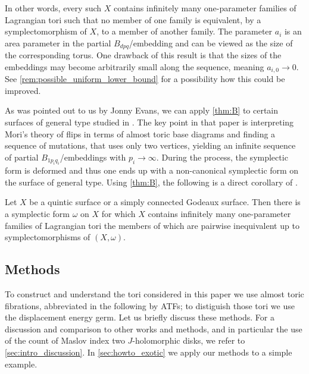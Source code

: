 \documentclass[AIF,Unicode,manuscript]{cedram}
\begin{document}
In other words, every such $X$ contains infinitely many one-parameter families of Lagrangian tori such that no member of one family is equivalent,  by a symplectomorphism of $X$, to a member of another family.
The parameter $a_i$ is an area parameter in the partial $B_{dpq}$\-/embedding and can be viewed as the size of the corresponding torus.
One drawback of this result is that the sizes of the embeddings may become arbitrarily small along the sequence, meaning $a_{i,0} \rightarrow 0$.
See \cref{rem:possible_uniform_lower_bound} for a possibility how this could be improved.

As was pointed out to us by Jonny Evans, we can apply \cref{thm:B} to certain surfaces of general type studied in \cite{EvaUrz21}.
The key point in that paper is interpreting Mori's theory of flips in terms of almost toric base diagrams and finding a sequence of mutations, that uses only two vertices,  yielding an infinite sequence of partial $B_{1p_iq_i}$\-/embeddings with $p_i \rightarrow \infty$.
During the process, the symplectic form is deformed and thus one ends up with a non-canonical symplectic form on the surface of general type.
Using \cref{thm:B}, the following is a direct corollary of \cite[Theorem 1.1]{EvaUrz21}.

\begin{corollary}
    \label{thm:quinticgodeaux}
    Let $X$ be a quintic surface or a simply connected Godeaux surface.
Then there is a symplectic form $\omega$ on $X$ for which $X$ contains infinitely many one-parameter families of Lagrangian tori the members of which are pairwise inequivalent up to symplectomorphisms of $(X,\omega)$.
\end{corollary}

\subsection{Methods}
\label{sec:intro_methods}

To construct and understand the tori considered in this paper we use almost toric fibrations, abbreviated in the following by ATFs; to distiguish those tori we use the displacement energy germ.
Let us briefly discuss these methods.
For a discussion and comparison to other works and methods, and in particular the use of the count of Maslov index two $J$-holomorphic disks, we refer to \cref{sec:intro_discussion}.
In \cref{sec:howto_exotic} we apply our methods to a simple example.
\end{document}
